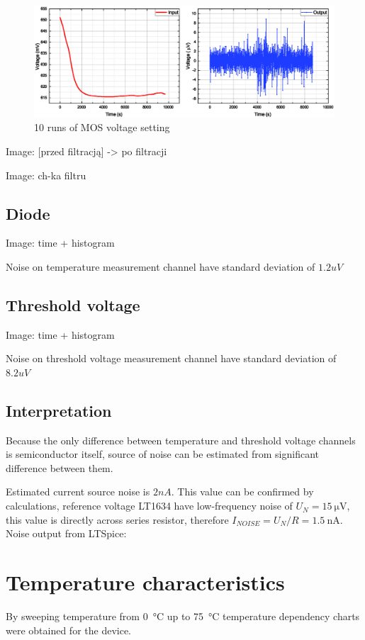     \begin{figure}[H]
        \centering
        \includegraphics[width=0.8\paperwidth]{img/07/filterBeforeAfter.eps}
        \caption{10 runs of MOS voltage setting}
        \label{MOS_settling}
    \end{figure}

    Image: [przed filtracją] -> po filtracji

    Image: ch-ka filtru

    \subsection{Diode}
        Image: time + histogram

        Noise on temperature measurement channel have standard deviation of $1.2 uV$
    \subsection{Threshold voltage}
        Image: time + histogram

        Noise on threshold voltage measurement channel have standard deviation of $8.2 uV$

    \subsection{Interpretation}
        Because the only difference between temperature and threshold voltage channels is semiconductor itself, source of noise can be estimated from significant difference between them.

        Estimated current source noise is $2 nA$.
        This value can be confirmed by calculations, reference voltage LT1634 have low-frequency noise of $U_N = \SI{15}{\uV}$, this value is directly across series resistor, therefore $I_{NOISE} = U_N/R = \SI{1.5}{\nA}$. Noise output from LTSpice:



\section{Temperature characteristics}
    By sweeping temperature from \SI{0}{\degreeCelsius} up to \SI{75}{\degreeCelsius} temperature dependency charts were obtained for the device.

